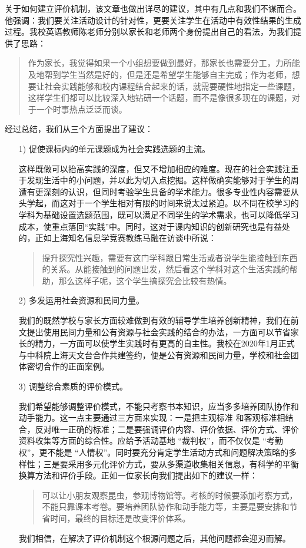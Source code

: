 \documentclass[12pt,UTF8]{ctexart}
\begin{document}
\par {
	
	关于如何建立评价机制，该文章也做出详尽的建议，其中有几点和我们不谋而合。他强调：我们要关注活动设计的针对性，更要关注学生在活动中有效性结果的生成过程。我校英语教师陈老师分别以家长和老师两个身份提出自己的看法，为我们提供了思路：
	\begin{quote}
		\kaishu
		作为家长，我觉得如果一个小组想要做到最好，那家长也需要分工，力所能及地帮到学生当然是好的，但是还是希望学生能够自主完成；作为老师，想要让社会实践能够和校内课程结合起来的话，就需要硬性地指定一些课题，这样学生们都可以比较深入地钻研一个话题，而不是像很多现在的课题，对于一个时事热点泛泛而谈。
	\end{quote}
}
\par {
	经过总结，我们从三个方面提出了建议：
}
\begin{itemize}
	\item [1)] 促使课标内的单元课题成为社会实践选题的主流。
	\par {
		
		这样既做可以抬高实践的深度，但又不增加相应的难度。现在的社会实践注重于发现生活中的小问题，并以此为切入点挖掘。这样做确实能够对于学生的周遭有更深刻的认识，但同时考验学生具备的学术能力。很多专业性内容需要从头学起，而这对于一个学生相对有限的时间来说太过紧迫。以不同在校学习的学科为基础设置选题范围，既可以满足不同学生的学术需求，也可以降低学习成本，使重点落回“实践”中。同时，这对于课内知识的创新研究也是有益处的，正如上海知名信息学竞赛教练马融在访谈中所说：
		\begin{quote}
			\kaishu
			提升探究性兴趣，需要有这门学科跟日常生活或者说学生能接触到东西的关系。从能接触到的问题出发，然后看这个学科对这个生活实践的帮助，那么这样子呢，这个学生搞探究会比较有热情。
		\end{quote}
	}
	\item [2)] 多发运用社会资源和民间力量。
	\par {
		
		我们的既然学校与家长方面较难做到有效的辅导学生培养创新精神，我们在前文提出使用民间力量和公有资源与社会实践的结合的办法，一方面可以节省家长的精力，一方面可以使学生实践时有更高的自主性。我校在2020年1月正式与中科院上海天文台合作共建签约，便是公有资源和民间力量，学校和社会团体密切合作的正面案例。
	}
	\item [3)] 调整综合素质的评价模式。
	\par {
		我们希望能够调整评价模式，不能只考察书本知识，应当多多培养团队协作和动手能力。这一点主要通过三方面来实现：一是把主观标准
		和客观标准相结合，反对唯一正确的标准；二是要强调评价内容、评价依据、评价方式、评价资料收集等方面的综合性。应给予活动基地 “裁判权”，而不仅仅是
		“考勤权”，更不能是
		“人情权”。同时要充分肯定学生活动方式和问题解决策略的多样性；三是要采用多元化评价方式，要从多渠道收集相关信息，有科学的平衡换算方法和评价手段。正如一位家长向我们提出如下的建议一样：
		\begin{quote}
			\kaishu
			可以让小朋友观察昆虫，参观博物馆等。考核的时候要添加考察方式，不能只靠课本考卷。要培养团队协作和动手能力等，主要是要安排和节省时间，最终的目标还是改变评价体系。
		\end{quote}
		我们相信，在解决了评价机制这个根源问题之后，其他问题都会迎刃而解。
	}
\end{itemize}
\end{document}
